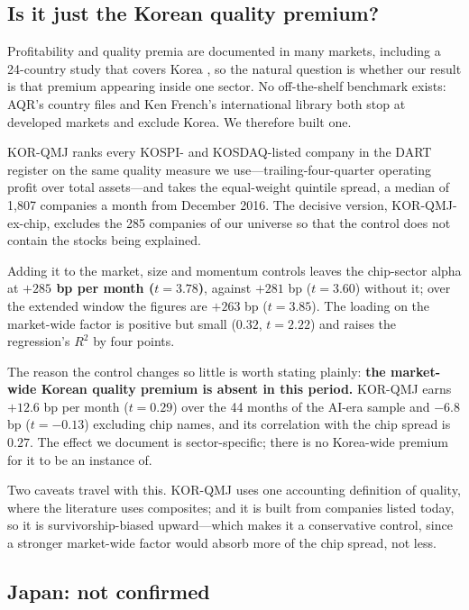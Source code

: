 \documentclass[12pt,a4paper]{article}
\begin{document}
\subsection{Is it just the Korean quality premium?}\label{sec:qualitycontrol}

Profitability and quality premia are documented in many markets, including a 24-country study that covers Korea
\citep{asness2019}, so the natural question is whether our result is that premium appearing inside one sector. No
off-the-shelf benchmark exists: AQR's country files and Ken French's international library both stop at developed
markets and exclude Korea. We therefore built one.

KOR-QMJ ranks every KOSPI- and KOSDAQ-listed company in the DART register on the same quality measure we
use---trailing-four-quarter operating profit over total assets---and takes the equal-weight quintile spread, a median of
1{,}807 companies a month from December 2016. The decisive version, KOR-QMJ-ex-chip, excludes the 285 companies of our
universe so that the control does not contain the stocks being explained.

Adding it to the market, size and momentum controls leaves the chip-sector alpha at \textbf{$+285$ bp per month
($t=3.78$)}, against $+281$ bp ($t=3.60$) without it; over the extended window the figures are $+263$ bp ($t=3.85$). The
loading on the market-wide factor is positive but small ($0.32$, $t=2.22$) and raises the regression's $R^2$ by four
points.

The reason the control changes so little is worth stating plainly: \textbf{the market-wide Korean quality premium is
absent in this period.} KOR-QMJ earns $+12.6$ bp per month ($t=0.29$) over the 44 months of the AI-era sample and
$-6.8$ bp ($t=-0.13$) excluding chip names, and its correlation with the chip spread is $0.27$. The effect we document
is sector-specific; there is no Korea-wide premium for it to be an instance of.

Two caveats travel with this. KOR-QMJ uses one accounting definition of quality, where the literature uses composites;
and it is built from companies listed today, so it is survivorship-biased upward---which makes it a conservative
control, since a stronger market-wide factor would absorb more of the chip spread, not less.

\subsection{Japan: not confirmed}\label{sec:japan}
\end{document}
